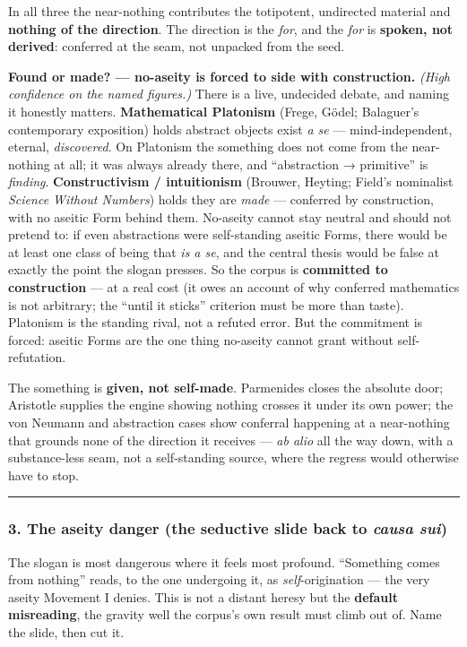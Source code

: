 \documentclass[11pt]{article}
\begin{document}
In all three the near-nothing contributes the totipotent, undirected material and \textbf{nothing of the direction}. The direction is the \emph{for}, and the \emph{for} is \textbf{spoken, not derived}: conferred at the seam, not unpacked from the seed.

\textbf{Found or made? — no-aseity is forced to side with construction.} \emph{(High confidence on the named figures.)} There is a live, undecided debate, and naming it honestly matters. \textbf{Mathematical Platonism} (Frege, Gödel; Balaguer's contemporary exposition) holds abstract objects exist \emph{a se} — mind-independent, eternal, \emph{discovered}. On Platonism the something does not come from the near-nothing at all; it was always already there, and ``abstraction → primitive'' is \emph{finding}. \textbf{Constructivism /\allowbreak{} intuitionism} (Brouwer, Heyting; Field's nominalist \emph{Science Without Numbers}) holds they are \emph{made} — conferred by construction, with no aseitic Form behind them. No-aseity cannot stay neutral and should not pretend to: if even abstractions were self-standing aseitic Forms, there would be at least one class of being that \emph{is a se}, and the central thesis would be false at exactly the point the slogan presses. So the corpus is \textbf{committed to construction} — at a real cost (it owes an account of why conferred mathematics is not arbitrary; the ``until it sticks'' criterion must be more than taste). Platonism is the standing rival, not a refuted error. But the commitment is forced: aseitic Forms are the one thing no-aseity cannot grant without self-refutation.

The something is \textbf{given, not self-made}. Parmenides closes the absolute door; Aristotle supplies the engine showing nothing crosses it under its own power; the von Neumann and abstraction cases show conferral happening at a near-nothing that grounds none of the direction it receives — \emph{ab alio} all the way down, with a substance-less seam, not a self-standing source, where the regress would otherwise have to stop.

\medskip\noindent\rule{\linewidth}{0.3pt}\medskip

\subsubsection*{3. The aseity danger (the seductive slide back to \emph{causa sui})}

The slogan is most dangerous where it feels most profound. ``Something comes from nothing'' reads, to the one undergoing it, as \emph{self}-origination — the very aseity Movement I denies. This is not a distant heresy but the \textbf{default misreading}, the gravity well the corpus's own result must climb out of. Name the slide, then cut it.
\end{document}
